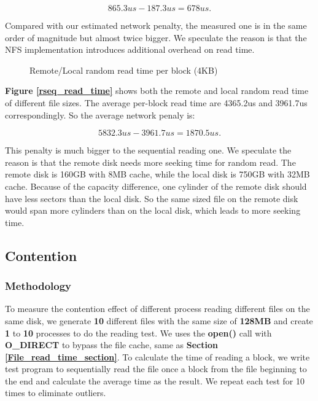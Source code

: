 $$865.3us - 187.3us = 678us.$$

Compared with our estimated network penalty, the measured one is in the same order of magnitude but almost twice bigger. We speculate the reason is that the NFS implementation introduces additional overhead on read time.

\begin{figure}[ht]
    \centering
    \caption{Remote/Local random read time per block (4KB)}
    \label{rrand_read_time}
\end{figure}

\textbf{Figure \ref{rseq_read_time}} shows both the remote and local random read time of different file sizes. The average per-block read time are 4365.2us and 3961.7us correspondingly. So the average network penaly is:

$$5832.3us - 3961.7us = 1870.5us.$$

This penalty is much bigger to the sequential reading one. We speculate the reason is that the remote disk needs more seeking time for random read. The remote disk is 160GB with 8MB cache, while the local disk is 750GB with 32MB cache. Because of the capacity difference, one cylinder of the remote disk should have less sectors than the local disk. So the same sized file on the remote disk would span more cylinders than on the local disk, which leads to more seeking time.

\subsection{Contention}
\subsubsection{Methodology}
To measure the contention effect of different process reading different files on the same disk, we generate \textbf{10} different files with the same size of \textbf{128MB} and create \textbf{1} to \textbf{10} processes to do the reading test. We uses the \textbf{open()} call with \textbf{O\_DIRECT} to bypass the file cache, same as \textbf{Section \ref{File_read_time_section}}. To calculate the time of reading a block, we write test program to sequentially read the file once a block from the file beginning to the end and calculate the average time as the result. We repeat each test for 10 times to eliminate outliers.

